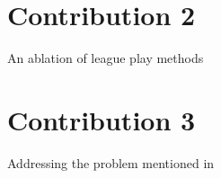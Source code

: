\section{Contribution 2}
An ablation of league play methods



\section{Contribution 3}
Addressing the problem mentioned in \cite{smit2023}
